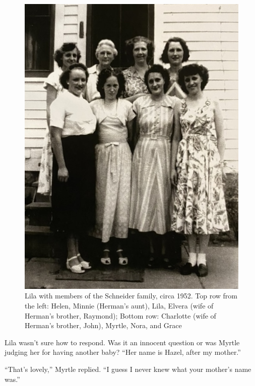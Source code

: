 \documentclass[
  letterpaper,
]{book}
\begin{document}
\begin{figure}[H]

{\centering \includegraphics[width=0.85\linewidth,height=\textheight,keepaspectratio]{images/Akou24.jpeg}

}

\caption[Lila with members of the Schneider family, circa 1952.]{Lila
with members of the Schneider family, circa 1952. Top row from the left:
Helen, Minnie (Herman's aunt), Lila, Elvera (wife of Herman's brother,
Raymond); Bottom row: Charlotte (wife of Herman's brother, John),
Myrtle, Nora, and Grace}

\end{figure}%

Lila wasn't sure how to respond. Was it an innocent question or was
Myrtle judging her for having another baby? ``Her name is Hazel, after
my mother.''

``That's lovely,'' Myrtle replied. ``I guess I never knew what your
mother's name was.''
\end{document}
